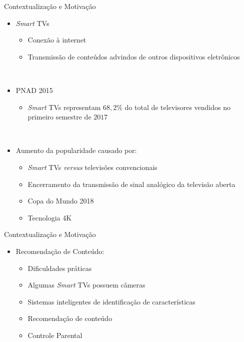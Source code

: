 \begin{frame}{Contextualização e Motivação}
         \ \  \\[0.1cm]
    \begin{itemize}

      \item \alert{\emph{Smart} TVs}
      \begin{itemize}
          \item Conexão à internet
          \item Transmissão de conteúdos advindos de outros dispositivos eletrônicos
      \end{itemize}
      \ \ \newline
      \item PNAD 2015
      \begin{itemize}
        \item \emph{Smart} TVs representam $68,2\%$ do total de televisores vendidos no primeiro semestre de $2017$
      \end{itemize}
      \ \ \newline
      \item Aumento da popularidade causado por:
      \begin{itemize}
        \item \emph{Smart} TVs \emph{versus} televisões convencionais
        \item Encerramento da transmissão de sinal analógico da televisão aberta
        \item Copa do Mundo 2018
        \item Tecnologia 4K
      \end{itemize}

    \end{itemize}
\end{frame}

\begin{frame}{Contextualização e Motivação}
   \ \  \\[0.1cm]
  \begin{itemize}
  \item \alert{Recomendação de Conteúdo}:
  \begin{itemize}
    \item Dificuldades práticas
    \item Algumas \emph{Smart} TVs possuem câmeras
    \item Sistemas inteligentes de identificação de características
    \item Recomendação de conteúdo
    \item Controle Parental
  \end{itemize}
  \end{itemize}

\end{frame}

